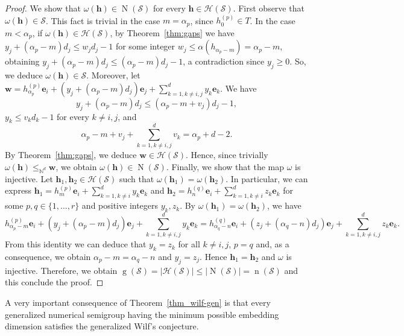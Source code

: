 \documentclass[12pt]{amsart}
\theoremstyle{plain}
\theoremstyle{theorem}
\newtheorem{remark}[definition]{Remark}
\theoremstyle{remark}
\begin{document}
\begin{proof}
We show that $\omega(\mathbf{h})\in \operatorname{N}(\mathcal{S})$ for every $\mathbf{h}\in \mathcal{H}(\mathcal{S})$. First observe that $\omega(\mathbf{h})\in \mathcal{S}$. This fact is trivial in the case $m=\alpha_p$, since $h^{(p)}_0\in T$. In the case $m<\alpha_{p}$, if $\omega(\mathbf{h})\in \mathcal{H}(\mathcal{S})$, by Theorem~\ref{thm:gaps} we have $y_j+(\alpha_p-m)d_j\leq w_jd_j-1$ for some integer $w_j\leq \alpha(h_{\alpha_p-m})=\alpha_p-m$, obtaining $y_j+(\alpha_p-m)d_j\leq (\alpha_p-m)d_j-1$, a contradiction since $y_j\geq 0$. So, we deduce $\omega(\mathbf{h})\in \mathcal{S}$. Moreover, let $\mathbf{w}=h_{\alpha_p}^{(p)}\mathbf{e}_i+(y_j+(\alpha_p-m)d_j)\mathbf{e}_j+\sum_{k=1,k\neq i,j}^{d}y_k\mathbf{e}_k$. We have $$y_j+(\alpha_p-m)d_j\leq (\alpha_p-m+v_j)d_j-1,$$ $y_k\leq v_kd_k-1$ for every $k\neq i,j$, and $$\alpha_p-m+v_j+\sum_{k=1,k\neq i,j}^dv_k=\alpha_p+d-2.$$ By Theorem~\ref{thm:gaps}, we deduce $\mathbf{w}\in \mathcal{H}(\mathcal{S})$. Hence, since trivially $\omega(\mathbf{h}) \leq_{\mathbb{N}^d}  \mathbf{w}$, we obtain $\omega(\mathbf{h})\in \operatorname{N}(\mathcal{S})$. Finally, we show that the map $\omega$ is injective. Let $\mathbf{h}_1,\mathbf{h}_2\in \mathcal{H}(\mathcal{S})$ such that $\omega(\mathbf{h}_1)=\omega(\mathbf{h}_2)$. In particular, we can express $\mathbf{h}_1=h_m^{(p)}\mathbf{e}_i+\sum_{k=1,k\neq i}^{d}y_k\mathbf{e}_k$ and $\mathbf{h}_2=h_n^{(q)}\mathbf{e}_i+\sum_{k=1,k\neq i}^{d}z_k\mathbf{e}_k$ for some $p,q\in \{1,\ldots,r\}$ and positive integers $y_k,z_k$. By $\omega(\mathbf{h}_1)=\omega(\mathbf{h}_2)$, we have $$h_{\alpha_p-m}^{(p)}\mathbf{e}_i+(y_j+(\alpha_p-m)d_j)\mathbf{e}_j+\sum_{k=1, k\neq i,j}^{d}y_k\mathbf{e}_k=h_{\alpha_q-n}^{(q)}\mathbf{e}_i+(z_j+(\alpha_q-n)d_j)\mathbf{e}_j+\sum_{k=1, k\neq i,j}^{d}z_k\mathbf{e}_k.$$
 From this identity we can deduce that $y_k=z_k$ for all $k\neq i,j$, $p=q$ and, as a consequence, we obtain $\alpha_p-m=\alpha_q-n$ and $y_j=z_j$. Hence $\mathbf{h}_1=\mathbf{h}_2$ and $\omega$ is injective. Therefore, we obtain $\operatorname{g}(\mathcal{S})=|\mathcal{H}(\mathcal{S})|\leq |\operatorname{N}(\mathcal{S})|=\operatorname{n}(\mathcal{S})$ and this conclude the proof.
\end{proof}



A very important consequence of Theorem~\ref{thm_wilf-gen} is that every generalized numerical semigroup having the minimum possible embedding dimension  satisfies the generalized Wilf's conjecture.
\end{document}
